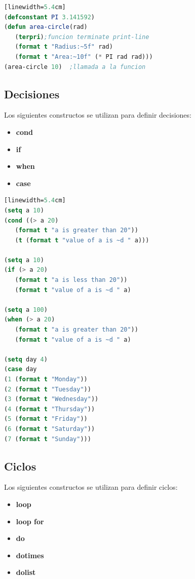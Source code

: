 \documentclass[10pt,journal,compsoc]{IEEEtran}
\begin{document}
\begin{lstlisting}[language=Lisp, caption = {Definir funciones y constantes}][linewidth=5.4cm]
(defconstant PI 3.141592)
(defun area-circle(rad)
   (terpri);funcion terminate print-line
   (format t "Radius:~5f" rad)
   (format t "Area:~10f" (* PI rad rad)))
(area-circle 10)  ;llamada a la funcion
\end{lstlisting}

\subsection{Decisiones}
Los siguientes constructos se utilizan para definir decisiones: 
\begin{itemize}
	\item \textbf{cond}
	\item \textbf{if}
	\item \textbf{when}
	\item \textbf{case}
\end{itemize}
\begin{lstlisting}[language=Lisp, caption = {Ejemplos de decisiones}][linewidth=5.4cm]
(setq a 10)
(cond ((> a 20)
   (format t "a is greater than 20"))
   (t (format t "value of a is ~d " a)))

(setq a 10)
(if (> a 20)
   (format t "a is less than 20"))
   (format t "value of a is ~d " a)
   
(setq a 100)
(when (> a 20)
   (format t "a is greater than 20"))
   (format t "value of a is ~d " a)
   
(setq day 4)
(case day
(1 (format t "Monday"))
(2 (format t "Tuesday"))
(3 (format t "Wednesday"))
(4 (format t "Thursday"))
(5 (format t "Friday"))
(6 (format t "Saturday"))
(7 (format t "Sunday")))
\end{lstlisting}

\subsection{Ciclos}
Los siguientes constructos se utilizan para definir ciclos: 
\begin{itemize}
	\item \textbf{loop}
	\item \textbf{loop for}
	\item \textbf{do}
	\item \textbf{dotimes}
	\item \textbf{dolist}
\end{itemize}
\end{document}
